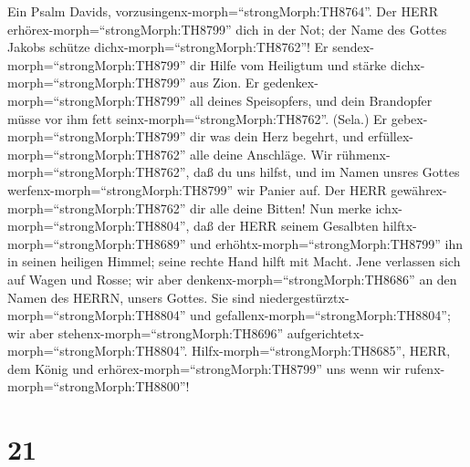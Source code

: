  Ein Psalm Davids,
vorzusingenx-morph=``strongMorph:TH8764''. Der HERR
erhörex-morph=``strongMorph:TH8799'' dich in der Not; der Name des
Gottes Jakobs schütze dichx-morph=``strongMorph:TH8762''! 
Er sendex-morph=``strongMorph:TH8799'' dir Hilfe vom Heiligtum und
stärke dichx-morph=``strongMorph:TH8799'' aus Zion.  Er
gedenkex-morph=``strongMorph:TH8799'' all deines Speisopfers, und dein
Brandopfer müsse vor ihm fett seinx-morph=``strongMorph:TH8762''.
(Sela.)  Er gebex-morph=``strongMorph:TH8799'' dir was dein
Herz begehrt, und erfüllex-morph=``strongMorph:TH8762'' alle deine
Anschläge.  Wir rühmenx-morph=``strongMorph:TH8762'', daß du
uns hilfst, und im Namen unsres Gottes
werfenx-morph=``strongMorph:TH8799'' wir Panier auf. Der HERR
gewährex-morph=``strongMorph:TH8762'' dir alle deine Bitten!
 Nun merke ichx-morph=``strongMorph:TH8804'', daß der HERR
seinem Gesalbten hilftx-morph=``strongMorph:TH8689'' und
erhöhtx-morph=``strongMorph:TH8799'' ihn in seinen heiligen Himmel;
seine rechte Hand hilft mit Macht.  Jene verlassen sich auf
Wagen und Rosse; wir aber denkenx-morph=``strongMorph:TH8686'' an den
Namen des HERRN, unsers Gottes.  Sie sind
niedergestürztx-morph=``strongMorph:TH8804'' und
gefallenx-morph=``strongMorph:TH8804''; wir aber
stehenx-morph=``strongMorph:TH8696''
aufgerichtetx-morph=``strongMorph:TH8804''. 
Hilfx-morph=``strongMorph:TH8685'', HERR, dem König und
erhörex-morph=``strongMorph:TH8799'' uns wenn wir
rufenx-morph=``strongMorph:TH8800''!

\hypertarget{section-20}{%
\section{21}\label{section-20}}

